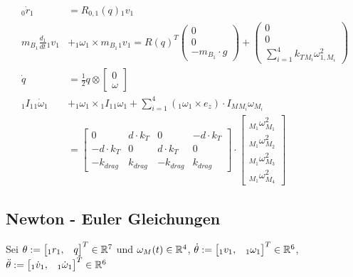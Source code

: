 \begin{align}
    {_{0}\dot{r}_{1}} &= R_{0, 1}(q) {_{1}v_{1}} \\
    m_{B_1} \frac{d_1}{dt} {_{1}v_{1}} &+ {_{1}\omega_{1}} \times m_{B_1} {_{1}v_{1}} = R(q)^T \begin{pmatrix} 0 \\ 0 \\ -m_{B_1} \cdot g \end{pmatrix} + {\begin{pmatrix} 0 \\ 0 \\ \sum_{i = 1}^4 k_{T} {_{M_i}\omega^2_{1, M_i}} \end{pmatrix}} \\
    \dot q &= \frac{1}{2} q \otimes \begin{bmatrix} 0 \\ \omega \end{bmatrix} \\
    {_{1} I_{1}} {_{1} \dot{\omega}_{1}} &+ {_{1} {\omega}_{1}} \times {_{1} I_{1}} {_{1} {\omega}_{1}} + \sum_{i=1}^{4}{({_{1}{\omega}_{1}} \times e_z) \cdot I_{M} {_{M_i}\omega_{M_i}} } \\
    &= \begin{bmatrix} 0              & d \cdot k_{T} & 0             & -d \cdot k_{T} \\ 
                       -d \cdot k_{T} & 0             & d \cdot k_{T} & 0  \\
                       -k_{drag}      & k_{drag}      & -k_{drag}    & k_{drag}
       \end{bmatrix}
    \cdot 
    \begin{bmatrix}
      {_{M_1} {\omega}^2_{M_1}} \\
      {_{M_1} {\omega}^2_{M_2}}\\
      {_{M_1} {\omega}^2_{M_3}}\\
      {_{M_1} {\omega}^2_{M_4}}
    \end{bmatrix}
\end{align}


\subsection{Newton - Euler Gleichungen}\label{subsub:Rotationsmatrix}

Sei $\theta := \left[ \begin{matrix} {_{1}} r_{1}, &q \end{matrix} \right]^T \in \mathbb{R}^{7} $ und $\omega_M(t) \in \mathbb{R}^4$,
$\dot \theta := \left[ \begin{matrix} {_{1}} v_{1},&{_{1}} \omega_{1} \end{matrix}\right]^T \in \mathbb{R}^6 $,
$\ddot \theta := \left[ \begin{matrix} {_{1}}\dot v_{1},&{_{1}}\dot \omega_{1} \end{matrix} \right]^T \in \mathbb{R}^6$



